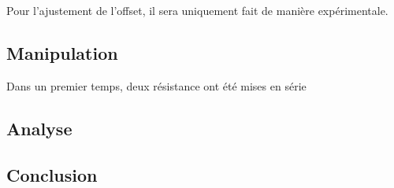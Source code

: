 Pour l'ajustement de l'offset, il sera uniquement fait de manière expérimentale.

\subsection{Manipulation}
Dans un premier temps, deux résistance ont été mises en série
\subsection{Analyse}

\subsection{Conclusion}